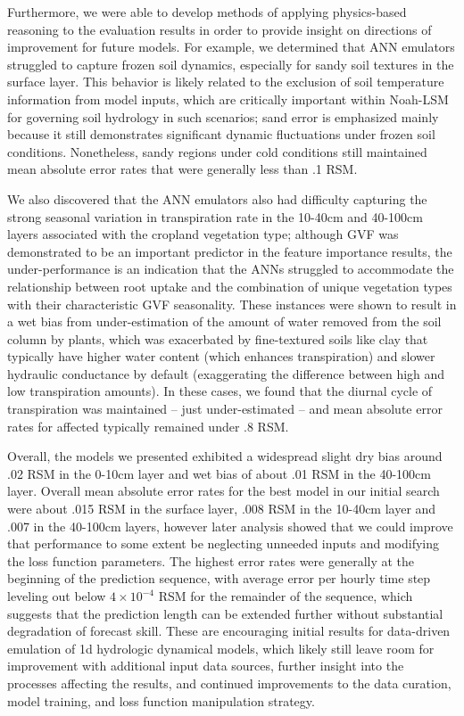 Furthermore, we were able to develop methods of applying physics-based reasoning to the evaluation results in order to provide insight on directions of improvement for future models. For example, we determined that ANN emulators struggled to capture frozen soil dynamics, especially for sandy soil textures in the surface layer. This behavior is likely related to the exclusion of soil temperature information from model inputs, which are critically important within Noah-LSM for governing soil hydrology in such scenarios; sand error is emphasized mainly because it still demonstrates significant dynamic fluctuations under frozen soil conditions. Nonetheless, sandy regions under cold conditions still maintained mean absolute error rates that were generally less than .1 RSM.

We also discovered that the ANN emulators also had difficulty capturing the strong seasonal variation in transpiration rate in the 10-40cm and 40-100cm layers associated with the cropland vegetation type; although GVF was demonstrated to be an important predictor in the feature importance results, the under-performance is an indication that the ANNs struggled to accommodate the relationship between root uptake and the combination of unique vegetation types with their characteristic GVF seasonality. These instances were shown to result in a wet bias from under-estimation of the amount of water removed from the soil column by plants, which was exacerbated by fine-textured soils like clay that typically have higher water content (which enhances transpiration) and slower hydraulic conductance by default (exaggerating the difference between high and low transpiration amounts). In these cases, we found that the diurnal cycle of transpiration was maintained -- just under-estimated -- and mean absolute error rates for affected typically remained under .8 RSM.

Overall, the models we presented exhibited a widespread slight dry bias around .02 RSM in the 0-10cm layer and wet bias of about .01 RSM in the 40-100cm layer. Overall mean absolute error rates for the best model in our initial search were about .015 RSM in the surface layer, .008 RSM in the 10-40cm layer and .007 in the 40-100cm layers, however later analysis showed that we could improve that performance to some extent be neglecting unneeded inputs and modifying the loss function parameters. The highest error rates were generally at the beginning of the prediction sequence, with average error per hourly time step leveling out below $4\times 10^{-4}$ RSM for the remainder of the sequence, which suggests that the prediction length can be extended further without substantial degradation of forecast skill. These are encouraging initial results for data-driven emulation of 1d hydrologic dynamical models, which likely still leave room for improvement with additional input data sources, further insight into the processes affecting the results, and continued improvements to the data curation, model training, and loss function manipulation strategy.

